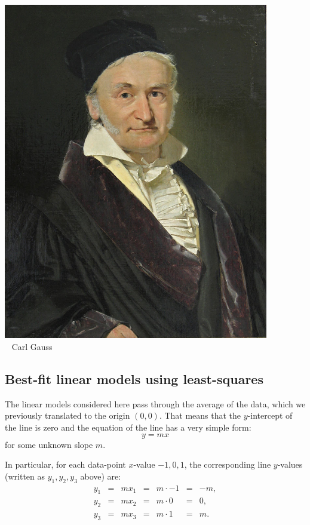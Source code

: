 \documentclass[10pt]{article}
\begin{document}
\begin{minipage}[c]{0.2\textwidth}
\includegraphics[width=0.87\textwidth]{gauss}\\
$\phantom{0}\,\,$Carl Gauss\\[12pt]
\end{minipage}



\subsection*{Best-fit linear models using least-squares}

The linear models considered here pass through the average
of the data, which we previously translated to the origin $(0,0)$.
That means that the $y$-intercept of the line is zero and the
equation of the line has a very simple form:
\[
y = mx
\]
for some unknown slope $m$.

In particular, for each data-point $x$-value $-1,0,1$, the corresponding line
$y$-values (written as $y_1, y_2, y_3$ above) are:
\[
\begin{array}{lclclcl}
y_1 &=& mx_1 &=& m\cdot -1 &=& -m,\\
y_2 &=& mx_2 &=& m\cdot 0 &=& 0,\\
y_3 &=& mx_3 &=& m\cdot 1 &=& m.\\
\end{array}
\]
\end{document}
